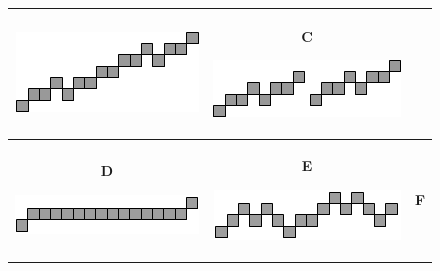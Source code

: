 \documentclass[12pt, a4paper]{article}
\begin{document}
\begin{minipage}{\textwidth}
\begin{table}[H]
\begin{tabulary}{\linewidth}{|C|C|C|}
					\includegraphics[width=0.9\linewidth]{option2}
					&
					\textbf{C} \vspace{0.4cm}
					
					\includegraphics[width=0.9\linewidth]{option3}
					\\ \hline
					\textbf{D} \vspace{0.8cm}
					
					\includegraphics[width=0.9\linewidth]{option4}
					&
					\textbf{E} \vspace{0.6cm}
					
					\includegraphics[width=0.9\linewidth]{option5}
					&
					\textbf{F} \vspace{0.2cm}
					

\end{tabulary}
\end{table}
\end{minipage}
\end{document}
